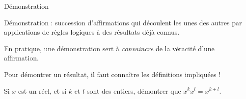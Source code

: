 \documentclass[french,xcolor=svgnames]{beamer}
\begin{document}


\begin{frame}{Démonstration}
  \begin{definition}
    Démonstration : succession d'affirmations qui découlent les unes des autres par applications de règles logiques à des résultats déjà connus.
  \end{definition}\pause{}

  En pratique, une démonstration sert à \emph{convaincre} de la véracité d'une affirmation.\pause{}

  Pour démontrer un résultat, il faut connaître les définitions impliquées !\pause{}
  \begin{example}\pause{}
    Si $x$ est un réel, et si $k$ et $l$ sont des entiers,\pause{} démontrer que $x^{k}x^{l} = x^{k+l}$.
  \end{example}
\end{frame}

\end{document}
